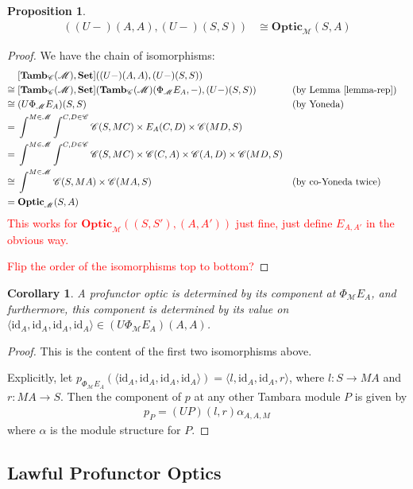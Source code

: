 \documentclass[11pt,a4paper]{article}
\theoremstyle{plain}
\newtheorem{proposition}[theorem]{Proposition}
\newtheorem{corollary}[theorem]{Corollary}
\theoremstyle{definition}
\newcommand{\C}{\mathscr{C}}
\newcommand{\M}{\mathscr{M}}
\newcommand{\Pastro}{\Phi}
\newcommand{\Set}{\mathbf{Set}}
\newcommand{\Optic}{\mathbf{Optic}}
\newcommand{\Tamb}{\mathbf{Tamb}}
\newcommand{\id}{\mathrm{id}}
\newcommand{\todo}[1]{\textcolor{red}{\small #1}}
\begin{document}
\begin{proposition}
\label{prop-profunctor-optics-are-optics}
\begin{align*}
[\Tamb_\C(\M), \Set]((U-)(A,A),(U-)(S,S)) &\cong \Optic_\M(S, A)
\end{align*}
\end{proposition}
\begin{proof}
We have the chain of isomorphisms:
\begin{align*}
&[\Tamb_\C(\M), \Set]((U-)(A,A),(U-)(S,S)) \\
\cong \;&[\Tamb_\C(\M), \Set](\Tamb_\C(\M)(\Pastro_\M E_A, -), (U-)(S,S))  && \text{(by Lemma \ref{lemma-rep})}\\
\cong \;&(U\Pastro_\M E_A)(S,S)  && \text{(by Yoneda)} \\
= \;&\int^{M \in \M} \int^{C,D \in \C} \C(S, MC) \times E_A(C,D) \times \C(MD,S) \\
= \;&\int^{M \in \M} \int^{C,D \in \C} \C(S, MC) \times \C(C,A) \times \C(A,D) \times \C(MD,S) \\
\cong \;&\int^{M \in \M} \C(S, MA) \times \C(MA, S)  && \text{(by co-Yoneda twice)} \\
= \;&\Optic_\M(S, A)
\end{align*}
\todo{This works for $\Optic_\M((S, S'), (A, A'))$ just fine, just define $E_{A,A'}$ in the obvious way.}

\todo{Flip the order of the isomorphisms top to bottom?}
\end{proof}

\begin{corollary}
A profunctor optic is determined by its component at $\Pastro_\M E_A$, and furthermore, this component is determined by its value on $\langle \id_A, \id_A, \id_A, \id_A \rangle \in (U \Pastro_\M E_A)(A, A)$.
\end{corollary}
\begin{proof}
This is the content of the first two isomorphisms above.

Explicitly, let $p_{\Pastro_\M E_A}(\langle \id_A, \id_A, \id_A, \id_A \rangle) = \langle l, \id_A, \id_A, r \rangle$, where $l : S \to M A$ and $r : M A \to S$. Then the component of $p$ at any other Tambara module $P$ is given by
\begin{align*}
p_P = (UP)(l,r) \alpha_{A,A,M}
\end{align*}
where $\alpha$ is the module structure for $P$.
\end{proof}

\subsection{Lawful Profunctor Optics}
\end{document}
